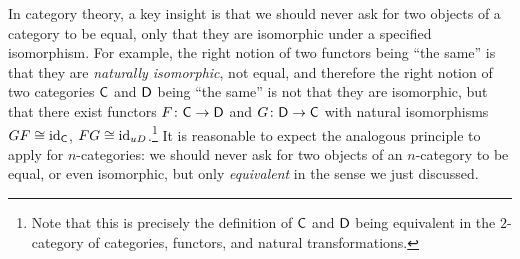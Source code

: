 \documentclass[a4paper,11pt]{article}
\begin{document}
In category theory, a key insight is that we should never ask for two
objects of a category to be equal, only that they are isomorphic under
a specified isomorphism. For example, the right notion of two functors
being ``the same'' is that they are \emph{naturally isomorphic}, not
equal, and therefore the right notion of two categories $\textup{\textsf{C}}$ and
$\textup{\textsf{D}}$ being ``the same'' is not that they are isomorphic, but that
there exist functors $F \colon \uC \to \uD$ and $G \colon \uD \to \uC$
with natural isomorphisms $GF \cong \text{\textup{id}}_{\textup{\textsf{C}}}$, $FG \cong
\text{\textup{id}}_{uD}$.\footnote{Note that this is precisely the definition of $\textup{\textsf{C}}$ and
$\textup{\textsf{D}}$ being equivalent in the $2$-category of categories, functors, and
natural transformations.} It is reasonable to expect the analogous
principle to apply for $n$-categories: we should never ask for two
objects of an $n$-category to be equal, or even isomorphic, but only
\emph{equivalent} in the sense we just discussed.
\end{document}
